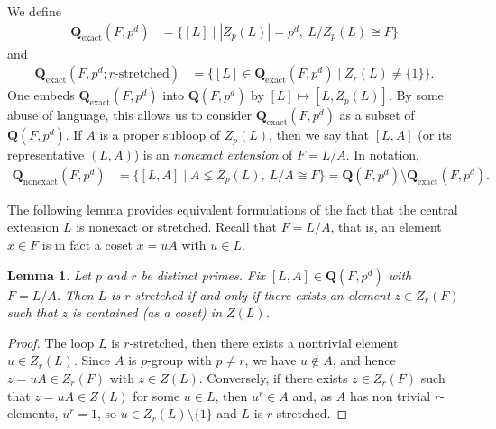 \documentclass[12pt,a4paper]{amsart}
\newtheorem{lemma}[theorem]{Lemma}
\theoremstyle{definition}
\newcommand{\boldQ}{\mathbf{Q}}
\newcommand{\boldQexact}{\mathbf{Q}_{\mathrm{exact}}}
\newcommand{\boldQnonexact}{\mathbf{Q}_{\mathrm{nonexact}}}
\begin{document}
We define
\begin{align} \label{eq:Qbold-exact}
\boldQexact(F,p^{d}) &= \bigl\{[L]\mid |Z_{p}(L)|=p^d,\ L/Z_{p}(L) \cong F\bigr\}
\end{align}
and
\begin{align} \label{eq:Qbold-stretched}
\boldQexact(F,p^{d};\text{$r$-stretched}) &= \bigl\{[L] \in \boldQexact(F,p^{d}) \mid Z_r(L)\neq \{1\}\}.
\end{align}
One embeds $\boldQexact(F,p^{d})$ into $\boldQ(F, p^{d})$ by $[L]\mapsto [L,Z_p(L)]$. By some abuse of language, this allows us to consider $\boldQexact(F,p^{d})$ as a subset of $\boldQ(F,p^{d})$. If $A$ is a proper subloop of $Z_p(L)$, then we say that $[L, A]$ (or its representative $(L, A)$) is an \textit{nonexact extension} of $F=L/A$. In notation, 
\begin{align} \label{eq:Qbold-nonexact}
\boldQnonexact(F,p^d) &= \bigl\{[L,A]\mid A \lneq Z_p(L),\ L/A \cong F\bigr\} = \boldQ(F, p^d) \setminus \boldQexact(F, p^d).
\end{align}

The following lemma provides equivalent formulations of the fact that the central extension $L$ is nonexact or stretched. Recall that $F=L/A$, that is, an element $x\in F$ is in fact a coset $x=uA$ with $u\in L$. 

\begin{lemma}\label{lem:stretched}
Let $p$ and $r$ be distinct primes. Fix $[L,A]\in \boldQ(F,p^d)$ with $F=L/A$. Then $L$ is $r$-stretched if and only if there exists an element $z\in Z_r(F)$ such that $z$ is contained (as a coset) in $Z(L)$.   
\end{lemma}
\begin{proof}
    The loop $L$ is $r$-stretched, then there exists a nontrivial element  $u \in Z_r(L)$. Since $A$ is $p$-group with $p\neq r$, we have $u \notin A$, and hence $z=uA \in Z_r(F)$ with $z\in Z(L)$.
    Conversely, if there exists $z \in Z_r(F)$ such that $z= uA\in Z(L)$ for some $u\in L$, then $u^r \in A$ and, as $A$ has non trivial $r$-elements, $u^r=1$, so $u\in Z_r(L)\setminus \{1\}$ and $L$ is $r$-stretched.
\end{proof}
\end{document}
